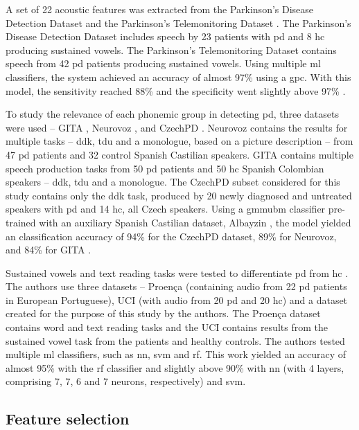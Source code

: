A set of 22 acoustic features was extracted from the Parkinson’s Disease Detection Dataset \cite{PDDD} and the Parkinson’s Telemonitoring Dataset \cite{PTD}. The Parkinson’s Disease Detection Dataset includes speech by 23 patients with \gls{pd} and 8 \gls{hc} producing sustained vowels. The Parkinson’s Telemonitoring Dataset contains speech from 42 \gls{pd} patients producing sustained vowels. Using multiple \gls{ml} classifiers, the system achieved an accuracy of almost 97\% using a \gls{gpc}. With this model, the sensitivity reached 88\% and the specificity went slightly above 97\% \cite{parkinson_acoustic_despotovic}.

To study the relevance of each phonemic group in detecting \gls{pd}, three datasets were used -- GITA \cite{GITA}, Neurovoz \cite{Neurovoz}, and CzechPD \cite{CzechPD}. Neurovoz contains the results for multiple tasks -- \gls{ddk}, \gls{tdu} and a monologue, based on a picture description -- from 47 \gls{pd} patients and 32 control Spanish Castilian speakers. GITA contains multiple speech production tasks from 50 \gls{pd} patients and 50 \gls{hc} Spanish Colombian speakers -- \gls{ddk}, \gls{tdu} and a monologue. The CzechPD subset considered for this study contains only the \gls{ddk} task, produced by 20 newly diagnosed and untreated speakers with \gls{pd} and 14 \gls{hc}, all Czech speakers. Using a \gls{gmmubm} classifier pre-trained with an auxiliary Spanish Castilian dataset, Albayzin \cite{Albayzin}, the model yielded an classification accuracy of 94\% for the CzechPD dataset, 89\% for Neurovoz, and 84\% for GITA \cite{parkinson_phonemic_relevance}. 

Sustained vowels and text reading tasks were tested to differentiate \gls{pd} from \gls{hc} \cite{parkinson_braga}. The authors use three datasets -- Proença \cite{Proenca} (containing audio from 22 \gls{pd} patients in European Portuguese), UCI \cite{UCI} (with audio from 20 \gls{pd} and 20 \gls{hc}) and a dataset created for the purpose of this study by the authors. The Proença dataset contains word and text reading tasks and the UCI contains results from the sustained vowel task from the patients and healthy controls. The authors tested multiple \gls{ml} classifiers, such as \gls{nn}, \gls{svm} and \gls{rf}. This work yielded an accuracy of almost 95\% with the \gls{rf} classifier and slightly above 90\% with \gls{nn} (with 4 layers, comprising 7, 7, 6 and 7 neurons, respectively) and \gls{svm}.

\subsection{Feature selection}

